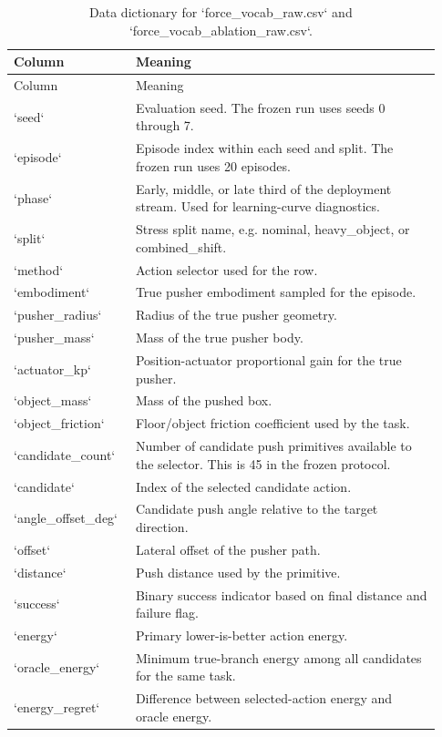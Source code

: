 \documentclass{article}
\begin{document}
\begin{longtable}{p{0.25\linewidth}p{0.68\linewidth}}
\caption{Data dictionary for `force\_vocab\_raw.csv` and `force\_vocab\_ablation\_raw.csv`.}\\
\toprule
Column & Meaning \\
\midrule
\endfirsthead
\toprule
Column & Meaning \\
\midrule
\endhead
`seed` & Evaluation seed. The frozen run uses seeds 0 through 7. \\
`episode` & Episode index within each seed and split. The frozen run uses 20 episodes. \\
`phase` & Early, middle, or late third of the deployment stream. Used for learning-curve diagnostics. \\
`split` & Stress split name, e.g. nominal, heavy\_object, or combined\_shift. \\
`method` & Action selector used for the row. \\
`embodiment` & True pusher embodiment sampled for the episode. \\
`pusher\_radius` & Radius of the true pusher geometry. \\
`pusher\_mass` & Mass of the true pusher body. \\
`actuator\_kp` & Position-actuator proportional gain for the true pusher. \\
`object\_mass` & Mass of the pushed box. \\
`object\_friction` & Floor/object friction coefficient used by the task. \\
`candidate\_count` & Number of candidate push primitives available to the selector. This is 45 in the frozen protocol. \\
`candidate` & Index of the selected candidate action. \\
`angle\_offset\_deg` & Candidate push angle relative to the target direction. \\
`offset` & Lateral offset of the pusher path. \\
`distance` & Push distance used by the primitive. \\
`success` & Binary success indicator based on final distance and failure flag. \\
`energy` & Primary lower-is-better action energy. \\
`oracle\_energy` & Minimum true-branch energy among all candidates for the same task. \\
`energy\_regret` & Difference between selected-action energy and oracle energy. \\

\end{longtable}
\end{document}
